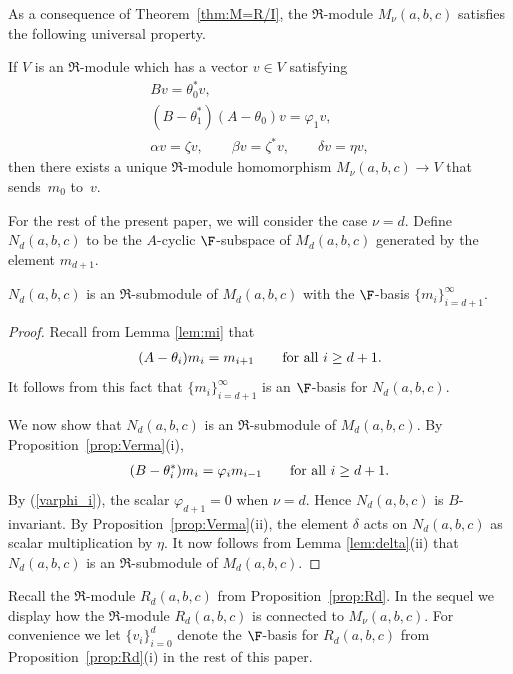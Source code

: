 As a consequence of Theorem~\ref{thm:M=R/I}, the $\Re$-module $M_\nu(a,b,c)$ satisfies the following universal property.

\begin{Proposition}\label{prop:universal}If $V$ is an $\Re$-module which has a vector $v\in V$ satisfying
\begin{gather*}
Bv=\theta_0^* v,\\
(B-\theta_1^*)(A-\theta_0)v=\varphi_1 v,\\
\alpha v=\zeta v,\qquad\beta v=\zeta^* v,\qquad\delta v=\eta v,
\end{gather*}
then there exists a unique $\Re$-module homomorphism $M_\nu(a,b,c)\to V$ that sends~$m_0$ to~$v$.
\end{Proposition}

For the rest of the present paper, we will consider the case $\nu=d$. Define $N_d(a,b,c)$ to be the $A$-cyclic $\F$-subspace of $M_d(a,b,c)$ generated by the element $m_{d+1}$.

\begin{Lemma}\label{lem:N}$N_d(a,b,c)$ is an $\Re$-submodule of $M_d(a,b,c)$ with the $\F$-basis $\{m_i\}_{i=d+1}^\infty$.
\end{Lemma}
\begin{proof}Recall from Lemma \ref{lem:mi} that
\begin{gather*}
(A-\theta_i) m_i=m_{i+1}\qquad \hbox{for all $i\geq d+1$}.
\end{gather*}
It follows from this fact that $\{m_i\}_{i=d+1}^\infty$ is an $\F$-basis for $N_d(a,b,c)$.

We now show that $N_d(a,b,c)$ is an $\Re$-submodule of $M_d(a,b,c)$. By Proposition~\ref{prop:Verma}(i),
\begin{gather*}
(B-\theta_i^*)m_i=\varphi_i m_{i-1} \qquad\hbox{for all $i\geq d+1$}.
\end{gather*}
By (\ref{varphi_i}), the scalar $\varphi_{d+1}=0$ when $\nu=d$. Hence $N_d(a,b,c)$ is $B$-invariant. By Proposition~\ref{prop:Verma}(ii), the element $\delta$ acts on $N_d(a,b,c)$ as scalar multiplication by $\eta$.
It now follows from Lemma \ref{lem:delta}(ii) that
 $N_d(a,b,c)$ is an $\Re$-submodule of $M_d(a,b,c)$.
\end{proof}

Recall the $\Re$-module $R_d(a,b,c)$ from Proposition~\ref{prop:Rd}. In the sequel we display how the $\Re$-module $R_d(a,b,c)$ is connected to $M_\nu(a,b,c)$. For convenience we let $\{v_i\}_{i=0}^d$ denote the $\F$-basis for $R_d(a,b,c)$ from Proposition~\ref{prop:Rd}(i) in the rest of this paper.

